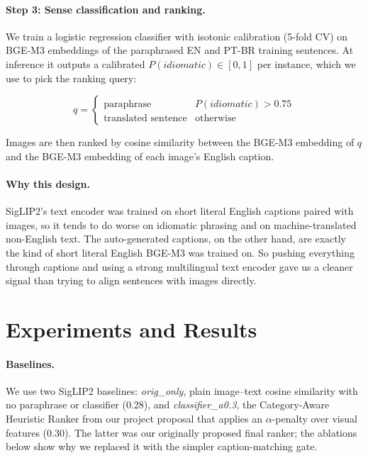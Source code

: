 \documentclass[11pt]{article}
\begin{document}
\paragraph{Step 3: Sense classification and ranking.}
We train a logistic regression classifier with isotonic calibration (5-fold
CV) on BGE-M3 embeddings of the paraphrased EN and PT-BR training sentences.
At inference it outputs a calibrated $P(\textit{idiomatic}) \in [0,1]$ per
instance, which we use to pick the ranking query:

\begin{equation*}
  q = \begin{cases}
    \text{paraphrase} & P(\textit{idiomatic}) > 0.75 \\
    \text{translated sentence} & \text{otherwise}
  \end{cases}
\end{equation*}

Images are then ranked by cosine similarity between the BGE-M3 embedding of
$q$ and the BGE-M3 embedding of each image's English caption.

\paragraph{Why this design.}
SigLIP2's text encoder was trained on short literal English captions paired
with images, so it tends to do worse on idiomatic phrasing and on
machine-translated non-English text. The auto-generated captions, on the
other hand, are exactly the kind of short literal English BGE-M3 was trained
on. So pushing everything through captions and using a strong multilingual
text encoder gave us a cleaner signal than trying to align sentences with
images directly.

\section{Experiments and Results}

\paragraph{Baselines.}
We use two SigLIP2 baselines: \textit{orig\_only}, plain image--text cosine
similarity with no paraphrase or classifier (0.28), and \textit{classifier\_a0.3},
the Category-Aware Heuristic Ranker from our project proposal that applies an
$\alpha$-penalty over visual features (0.30). The latter was our originally
proposed final ranker; the ablations below show why we replaced it with the
simpler caption-matching gate.
\end{document}

